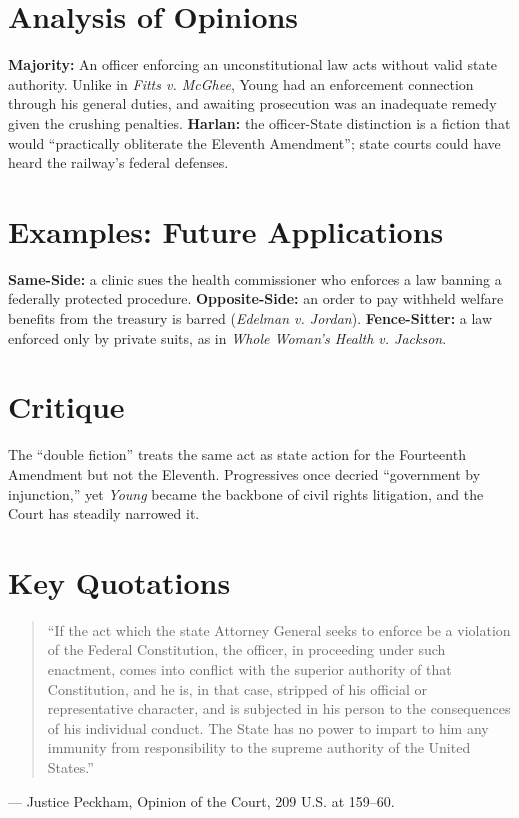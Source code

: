 \documentclass[12pt]{article}
\begin{document}
\section{Analysis of Opinions}
\textbf{Majority:} An officer enforcing an unconstitutional law acts without valid state authority. Unlike in \textit{Fitts v. McGhee}, Young had an enforcement connection through his general duties, and awaiting prosecution was an inadequate remedy given the crushing penalties. \textbf{Harlan:} the officer-State distinction is a fiction that would ``practically obliterate the Eleventh Amendment''; state courts could have heard the railway's federal defenses.

\section{Examples: Future Applications}
\textbf{Same-Side:} a clinic sues the health commissioner who enforces a law banning a federally protected procedure. \textbf{Opposite-Side:} an order to pay withheld welfare benefits from the treasury is barred (\textit{Edelman v. Jordan}). \textbf{Fence-Sitter:} a law enforced only by private suits, as in \textit{Whole Woman's Health v. Jackson}.

\section{Critique}
The ``double fiction'' treats the same act as state action for the Fourteenth Amendment but not the Eleventh. Progressives once decried ``government by injunction,'' yet \textit{Young} became the backbone of civil rights litigation, and the Court has steadily narrowed it.

\section{Key Quotations}
\begin{quote}
``If the act which the state Attorney General seeks to enforce be a violation of the Federal Constitution, the officer, in proceeding under such enactment, comes into conflict with the superior authority of that Constitution, and he is, in that case, stripped of his official or representative character, and is subjected in his person to the consequences of his individual conduct. The State has no power to impart to him any immunity from responsibility to the supreme authority of the United States.''
\end{quote}
\noindent --- Justice Peckham, Opinion of the Court, 209 U.S. at 159--60.
\end{document}
